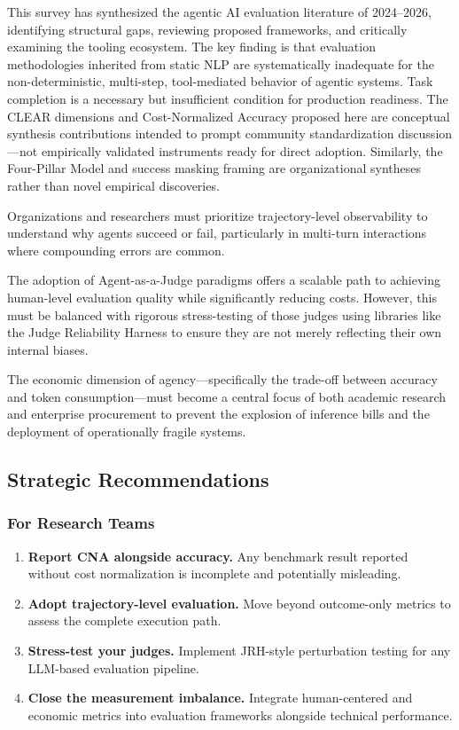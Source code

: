 This survey has synthesized the agentic AI evaluation literature of 2024--2026, identifying structural gaps, reviewing proposed frameworks, and critically examining the tooling ecosystem. The key finding is that evaluation methodologies inherited from static NLP are systematically inadequate for the non-deterministic, multi-step, tool-mediated behavior of agentic systems. Task completion is a necessary but insufficient condition for production readiness. The CLEAR dimensions and Cost-Normalized Accuracy proposed here are conceptual synthesis contributions intended to prompt community standardization discussion---not empirically validated instruments ready for direct adoption. Similarly, the Four-Pillar Model and success masking framing are organizational syntheses rather than novel empirical discoveries.

Organizations and researchers must prioritize trajectory-level observability to understand why agents succeed or fail, particularly in multi-turn interactions where compounding errors are common.

The adoption of Agent-as-a-Judge paradigms offers a scalable path to achieving human-level evaluation quality while significantly reducing costs. However, this must be balanced with rigorous stress-testing of those judges using libraries like the Judge Reliability Harness to ensure they are not merely reflecting their own internal biases.

The economic dimension of agency---specifically the trade-off between accuracy and token consumption---must become a central focus of both academic research and enterprise procurement to prevent the explosion of inference bills and the deployment of operationally fragile systems.

\subsection{Strategic Recommendations}

\subsubsection{For Research Teams}

\begin{enumerate}
    \item \textbf{Report CNA alongside accuracy.} Any benchmark result reported without cost normalization is incomplete and potentially misleading.
    \item \textbf{Adopt trajectory-level evaluation.} Move beyond outcome-only metrics to assess the complete execution path.
    \item \textbf{Stress-test your judges.} Implement JRH-style perturbation testing for any LLM-based evaluation pipeline.
    \item \textbf{Close the measurement imbalance.} Integrate human-centered and economic metrics into evaluation frameworks alongside technical performance.
\end{enumerate}

